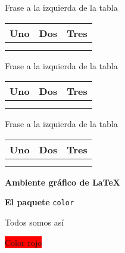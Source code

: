 \documentclass[12pt]{book}
\numberwithin{equation}{section}
\theoremstyle{plain}  %
\begin{document}
\vspace{2cm}
	Frase a la izquierda de la tabla \quad
	\begin{tabular}[t]{|c|c|c|} \hline
	Uno & Dos & Tres \\ \hline
	& & \\ \hline
	& & \\ \hline
\end{tabular}



\vspace{2cm}
	Frase a la izquierda de la tabla \quad
	\begin{tabular}[b]{|c|c|c|} \hline
		Uno & Dos & Tres \\ \hline
		& & \\ \hline
		& & \\ \hline
	\end{tabular}


\vspace{2cm}

	Frase a la izquierda de la tabla \quad
	\begin{tabular}[t]{|c|c|c|} \firsthline
		Uno & Dos & Tres \\ \hline
		& & \\ \hline
		& & \\ \hline
	\end{tabular}



\vspace{1.5cm}

\newpage
 
\noindent\textbf{Ambiente gráfico de \LaTeX}

\vspace{0.5cm}

\noindent\textbf{El paquete} \verb*|color|


 \vspace{0.5cm}

\textcolor{verde1}{Todos somos así}


 \vspace{0.5cm}

\pagecolor{green}

 \vspace{0.5cm}


\colorbox{red}{Color rojo}

 \vspace{0.5cm}




 \vspace{0.5cm}
\end{document}
